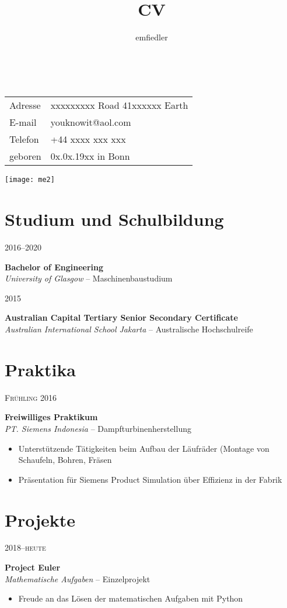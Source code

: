 \documentclass[a4paper]{article}
\title{CV}
\author{emfiedler}
\makeatletter
\renewcommand{\maketitle}{
\begin{flushleft}
{\Huge
\theauthor}\\
\vspace{3mm}
\hspace{3mm} 
\begingroup
\renewcommand{\arraystretch}{1.2}
\begin{tabular}{@{} p{15mm} p{50mm}}
	Adresse	&xxxxxxxxx Road 41\newline xxxxxx Earth\\
	E-mail 	&youknowit@aol.com\\
	Telefon	&+44 xxxx xxx xxx\\
	geboren	&0x.0x.19xx in Bonn
\end{tabular}
\endgroup

\end{flushleft}
}
\newcommand{\entry}[4]{

	\begin{minipage}[t]{.20\textwidth}
		\hfill \textsc{#1}

	\end{minipage}
	\hfill\vline\hfill
	\begin{minipage}[t]{.75\textwidth}
		\textbf{#2}\\ 
		\textit{#3}    
		#4

	\end{minipage} 
	\vspace{.25cm}

}
\makeatother
\begin{document}

\begin{minipage}{0.73\textwidth}
\maketitle
\end{minipage}
\begin{minipage}{0.25\textwidth}
	\hspace{2mm} 
	\vspace{-2mm} 
	\texttt{[image: me2]}
\end{minipage}

\section{Studium und Schulbildung}

\entry{2016--2020}{Bachelor of Engineering}{University of Glasgow}{-- Maschinenbaustudium}

\entry{2015}{Australian Capital Tertiary Senior Secondary Certificate}{Australian International School Jakarta}{-- Australische Hochschulreife}

\section{Praktika}

\entry{Fr{\"u}hling 2016}{Freiwilliges Praktikum}{PT. Siemens Indonesia}{-- Dampfturbinenherstellung\vspace{-.25cm} 
	\begin{itemize}[leftmargin=*]
		\setlength{\itemsep}{-3pt}
		\item Unterst{\"u}tzende T{\"a}tigkeiten beim Aufbau der L{\"a}ufr{\"a}der \newline \phantom{W}(Montage von Schaufeln, Bohren, Fr{\"a}sen
		\item Pr{\"a}sentation f{\"u}r Siemens Product Simulation {\"u}ber Effizienz in der Fabrik
	\end{itemize}	
}

\section{Projekte}

\entry{2018--heute}{Project Euler}{Mathematische Aufgaben}{-- Einzelprojekt\vspace{-.25cm}
	\begin{itemize}[leftmargin=*]
		\setlength{\itemsep}{-3pt}
	\item Freude an das L{\"o}sen der matematischen Aufgaben mit Python
	\end{itemize}
}
\end{document}
